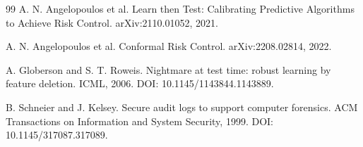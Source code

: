 \begin{thebibliography}{99}
A. N. Angelopoulos et al.
\newblock Learn then Test: Calibrating Predictive Algorithms to Achieve Risk Control.
\newblock arXiv:2110.01052, 2021.

A. N. Angelopoulos et al.
\newblock Conformal Risk Control.
\newblock arXiv:2208.02814, 2022.

A. Globerson and S. T. Roweis.
\newblock Nightmare at test time: robust learning by feature deletion.
\newblock ICML, 2006. DOI: 10.1145/1143844.1143889.

B. Schneier and J. Kelsey.
\newblock Secure audit logs to support computer forensics.
\newblock ACM Transactions on Information and System Security, 1999.
\newblock DOI: 10.1145/317087.317089.

\end{thebibliography}
